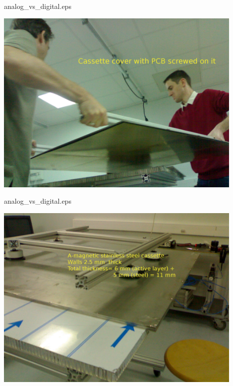 \begin{frame}{analog\_vs\_digital.eps}
  \centerline{\includegraphics[width=0.9\textwidth]{images/1m2Cover}}
\end{frame}
\begin{frame}{analog\_vs\_digital.eps}
  \centerline{\includegraphics[width=0.9\textwidth]{images/1m2Cassette}}
\end{frame}

